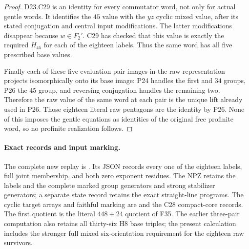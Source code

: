 \begin{proof}
D23.C29 is an identity for every commutator word, not only for
actual gentle words. It identifies the $45$ value with the $yz$
cyclic mixed value, after its stated conjugation and central
input modifications. The latter modifications disappear because
$w\in F_2'$. C29 has checked that this value is exactly the required
$H_{45}$ for each of the eighteen labels. Thus the same word has
all five prescribed base values.

Finally each of these five evaluation pair images in the raw
representation projects isomorphically onto its base image: P24
handles the first and $34$ groups, P26 the $45$ group, and reversing
conjugation handles the remaining two. Therefore the raw value of
the same word at each pair is the unique lift already used in P26.
Those eighteen literal raw pentagons are the identity by P26.
None of this imposes the gentle equations as identities of the
original free profinite word, so no profinite realization follows.
\end{proof}

\paragraph{Exact records and input marking.}
The complete new replay is
.
Its JSON records every one of the eighteen labels, full joint
membership, and both zero exponent residues. The NPZ retains the
labels and the complete marked group generators and strong
stabilizer generators; a separate state record retains the exact
straight-line programs. The cyclic target arrays and faithful
marking are
and the C28 compact-core records. The first quotient is the literal
$448+24$ quotient of F35. The earlier three-pair computation
 also retains all thirty-six H8
base triples; the present calculation includes the stronger full
mixed six-orientation requirement for the eighteen raw survivors.
